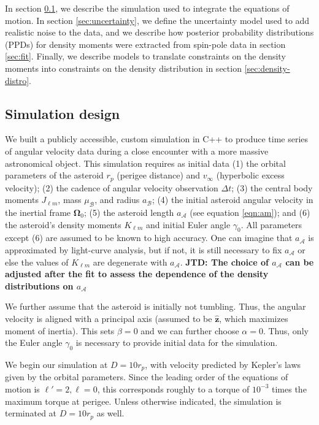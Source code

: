 \documentclass[fleqn,usenatbib]{mnras}
\newcommand{\jtd}[1]{ {\bf{\color{red} JTD: #1}} }
\newcommand{\unit}[1]{\bm{\hat{#1}}}
\begin{document}
In section \ref{sec:sim}, we describe the simulation used to integrate the equations of motion. In section \ref{sec:uncertainty}, we define the uncertainty model used to add realistic noise to the data, and we describe how posterior probability distributions (PPDs) for density moments were extracted from spin-pole data in section \ref{sec:fit}. Finally, we describe models to translate constraints on the density moments into constraints on the density distribution in section \ref{sec:density-distro}.


\subsection{Simulation design}
\label{sec:sim}

We built a publicly accessible, custom simulation in C++ to produce time series of angular velocity data during a close encounter with a more massive astronomical object. This simulation requires as initial data (1) the orbital parameters of the asteroid $r_p$ (perigee distance) and $v_\infty$ (hyperbolic excess velocity); (2) the cadence of angular velocity observation $\Delta t$; (3) the central body moments $J_{\ell m}$, mass $\mu_\mathcal{B}$, and radius $a_\mathcal{B}$; (4) the initial asteroid angular velocity in the inertial frame $\bm \Omega_0$; (5) the asteroid length $a_\mathcal{A}$ (see equation \ref{eqn:am}); and (6) the asteroid's density moments $K_{\ell m}$ and initial Euler angle $\gamma_0$. All parameters except (6) are assumed to be known to high accuracy. One can imagine that $a_\mathcal{A}$ is approximated by light-curve analysis, but if not, it is still necessary to fix $a_\mathcal{A}$ or else the values of $K_{\ell m}$ are degenerate with $a_\mathcal{A}$. \jtd{The choice of $a_\mathcal{A}$ can be adjusted after the fit to assess the dependence of the density distributions on $a_\mathcal{A}$}

We further assume that the asteroid is initially not tumbling. Thus, the angular velocity is aligned with a principal axis (assumed to be $\unit z$, which maximizes moment of inertia). This sets $\beta = 0$ and we can further choose $\alpha = 0$. Thus, only the Euler angle $\gamma_0$ is necessary to provide initial data for the simulation.

We begin our simulation at $D = 10 r_p$, with velocity predicted by Kepler's laws given by the orbital parameters. Since the leading order of the equations of motion is $\ell' = 2, \ell = 0$, this corresponds roughly to a torque of $10^{-3}$ times the maximum torque at perigee. Unless otherwise indicated, the simulation is terminated at $D=10 r_p$ as well.
\end{document}
